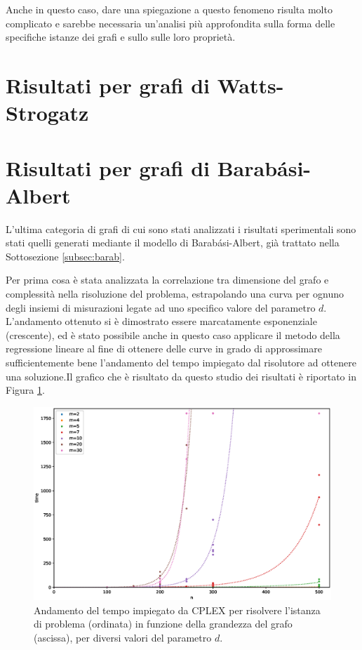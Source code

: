 Anche in questo caso, dare una spiegazione a questo fenomeno risulta molto complicato e sarebbe necessaria un'analisi più approfondita sulla forma delle specifiche istanze dei grafi e sullo sulle loro proprietà.

\section{Risultati per grafi di Watts-Strogatz}

\newpage
\section{Risultati per grafi di Barabási-Albert}
L'ultima categoria di grafi di cui sono stati analizzati i risultati sperimentali sono stati quelli generati mediante il modello di Barabási-Albert, già trattato nella Sottosezione \ref{subsec:barab}. 

Per prima cosa è stata analizzata la correlazione tra dimensione del grafo e complessità nella risoluzione del problema, estrapolando una curva per ognuno degli insiemi di misurazioni legate ad uno specifico valore del parametro $d$.  L'andamento ottenuto si è dimostrato essere marcatamente esponenziale (crescente), ed è stato possibile anche in questo caso applicare il metodo della regressione lineare al fine di ottenere delle curve in grado di approssimare sufficientemente bene l'andamento del tempo impiegato dal risolutore ad ottenere una soluzione.Il grafico che è risultato da questo studio dei risultati è riportato in Figura \ref{fig:bag1}.

\begin{figure}[h!]
     \centering
       \includegraphics[scale=0.5]{images/bag.eps}
       \caption{Andamento del tempo impiegato da CPLEX per risolvere l'istanza di problema (ordinata) in funzione della grandezza del grafo (ascissa), per diversi valori del parametro $d$.}      
        \label{fig:bag1}
\end{figure}

